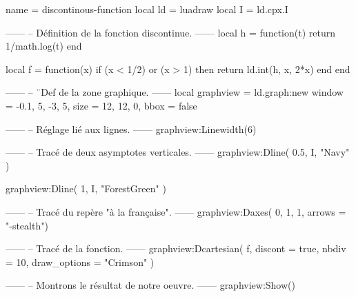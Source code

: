 \documentclass[border = 3pt]{standalone}
\begin{document}
\begin{luadraw}{name = discontinous-function}
local ld = luadraw
local I  = ld.cpx.I

------
-- Définition de la fonction discontinue.
------
local h = function(t)
  return 1/math.log(t)
end

local f = function(x)
  if (x < 1/2) or (x > 1) then
    return ld.int(h, x, 2*x)
  end
end

------
-- ¨Def de la zone graphique.
------
local graphview = ld.graph:new{
  window = {-0.1, 5, -3, 5},
  size   = {12, 12, 0},
  bbox   = false
}

------
-- Réglage lié aux lignes.
------
graphview:Linewidth(6)

------
-- Tracé de deux asymptotes verticales.
------
graphview:Dline(
  {0.5, I},
  "Navy"
)

graphview:Dline(
  {1, I},
  "ForestGreen"
)

------
-- Tracé du repère "à la française".
------
graphview:Daxes(
  {0, 1, 1},
  {arrows = "-stealth"})

------
-- Tracé de la fonction.
------
graphview:Dcartesian(
  f,
  {
    discont      = true,
    nbdiv        = 10,
    draw_options = "Crimson"
  })

------
-- Montrons le résultat de notre oeuvre.
------
graphview:Show()
\end{luadraw}
\end{document}
